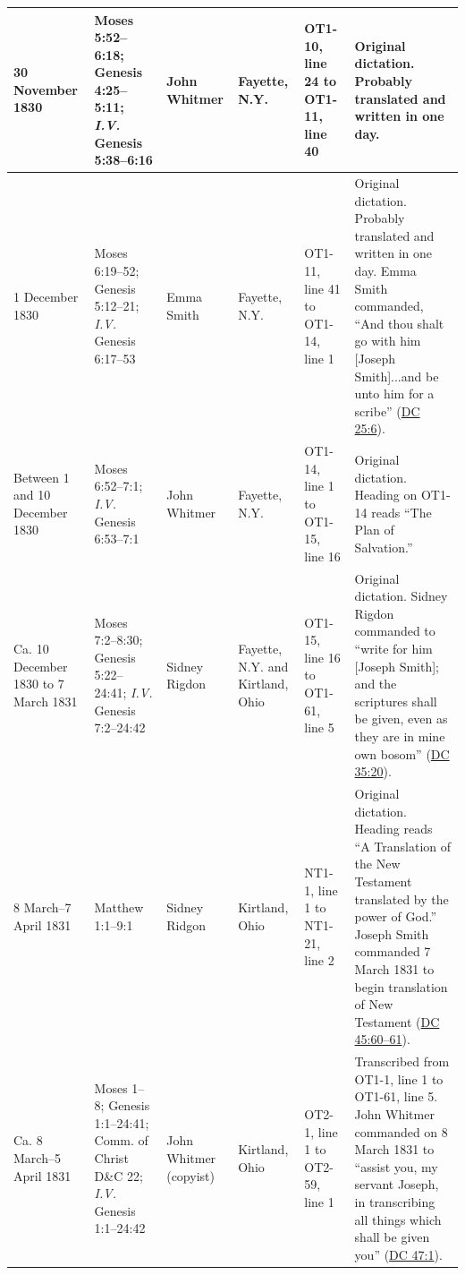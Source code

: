 \begin{landscape}
\begin{longtable}{p{1in}p{1.5in}p{1in}p{0.75in}p{1.5in}p{3in}}
			30 November 1830 & Moses 5:52--6:18; Genesis 4:25--5:11; \textit{I.V.} Genesis 5:38--6:16 & John Whitmer & Fayette, N.Y. & OT1-10, line 24 to OT1-11, line 40 & Original dictation. Probably translated and written in one day. \\ \hline
			
			1 December 1830 & Moses 6:19--52; Genesis 5:12--21; \textit{I.V.} Genesis 6:17--53 & Emma Smith & Fayette, N.Y. & OT1-11, line 41 to OT1-14, line 1 & Original dictation. Probably translated and written in one day. Emma Smith commanded, ``And thou shalt go with him [Joseph Smith]...and be unto him for a scribe'' (\hyperref[DC25-6]{DC 25:6}). \\ \hline
			
			Between 1 and 10 December 1830 & Moses 6:52--7:1; \textit{I.V.} Genesis 6:53--7:1 & John Whitmer & Fayette, N.Y. & OT1-14, line 1 to OT1-15, line 16 & Original dictation. Heading on OT1-14 reads ``The Plan of Salvation.'' \\ \hline
			
			Ca. 10 December 1830 to 7 March 1831 & Moses 7:2--8:30; Genesis 5:22--24:41; \textit{I.V.} Genesis 7:2--24:42 & Sidney Rigdon & Fayette, N.Y. and Kirtland, Ohio & OT1-15, line 16 to OT1-61, line 5 & Original dictation. Sidney Rigdon commanded to ``write for him [Joseph Smith]; and the scriptures shall be given, even as they are in mine own bosom'' (\hyperref[DC35-20]{DC 35:20}). \\ \hline
			
			8 March--7 April 1831 & Matthew 1:1--9:1 & Sidney Ridgon & Kirtland, Ohio & NT1-1, line 1 to NT1-21, line 2 & Original dictation. Heading reads ``A Translation of the New Testament translated by the power of God.'' Joseph Smith commanded 7 March 1831 to begin translation of New Testament (\hyperref[DC45-60]{DC 45:60--61}). \\ \hline
			
			Ca. 8 March--5 April 1831 & Moses 1--8; Genesis 1:1--24:41; Comm. of Christ D\&C 22; \textit{I.V.} Genesis 1:1--24:42 & John Whitmer (copyist) & Kirtland, Ohio & OT2-1, line 1 to OT2-59, line 1 & Transcribed from OT1-1, line 1 to OT1-61, line 5. John Whitmer commanded on 8 March 1831 to ``assist you, my servant Joseph, in transcribing all things which shall be given you'' (\hyperref[DC47-1]{DC 47:1}). \\ \hline
			

\end{longtable}
\end{landscape}
